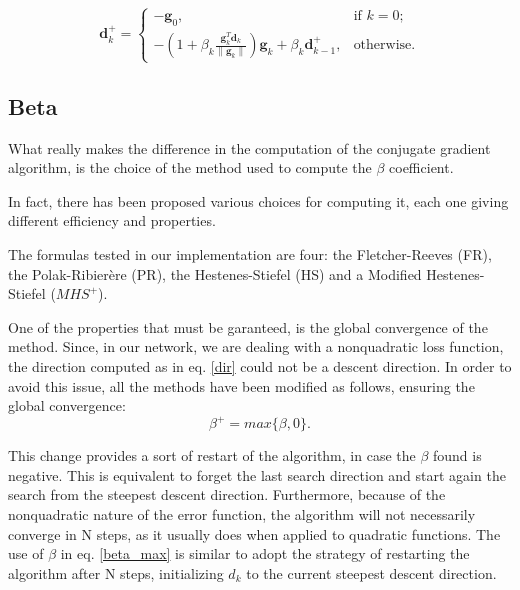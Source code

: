 			\begin{equation}
			\label{mod_dir}
				\textbf{d}_k^+=\begin{cases}
			    -\textbf{g}_0, & \text{if $k=0$};\\
			    -(1 + \beta_k\frac{\textbf{g}_k^T\textbf{d}_{k}}{\|\textbf{g}_k\|})\textbf{g}_k + \beta_k\textbf{d}_{k-1}^+, & \text{otherwise.}
			  \end{cases}
			\end{equation}



		\subsection{Beta}
		\label{sub:beta}
			What really makes the difference in the computation of the conjugate gradient algorithm, is the choice of the method used to compute the $\beta$ coefficient.

			In fact, there has been proposed various choices for computing it, each one giving different efficiency and properties.

			The formulas tested in our implementation are four: the Fletcher-Reeves (FR), the Polak-Ribierère (PR), the Hestenes-Stiefel (HS) and a Modified Hestenes-Stiefel ($MHS^+$).

			One of the properties that must be garanteed, is the global convergence of the method. Since, in our network, we are dealing with a nonquadratic loss function, the direction computed as in eq. \ref{dir} could not be a descent direction. In order to avoid this issue, all the methods have been modified as follows, ensuring the global convergence:
			\begin{equation}
			\label{beta_max}
				 \beta^+ = max\{\beta, 0\}.
			\end{equation}

			This change provides a sort of restart of the algorithm, in case the $\beta$ found is negative. This is equivalent to forget the last search direction and start again the search from the steepest descent direction. Furthermore, because of the nonquadratic nature of the error function, the algorithm will not necessarily converge in N steps, as it usually does when applied to quadratic functions. The use of $\beta$ in eq. \ref{beta_max} is similar to adopt the strategy of restarting the algorithm after N steps, initializing $d_k$ to the current steepest descent direction.%

